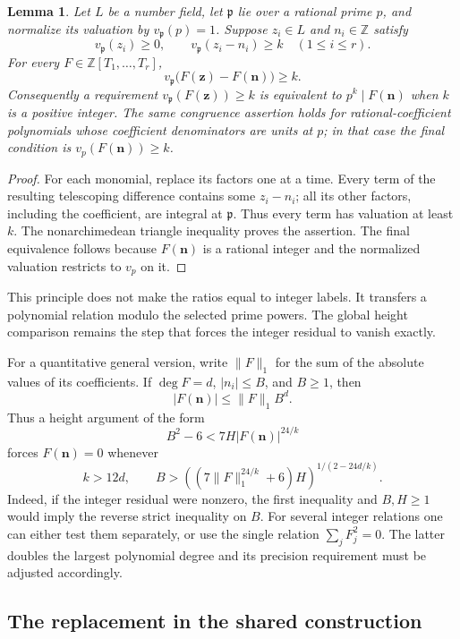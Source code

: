 \documentclass[11pt]{article}
\newtheorem{lemma}[theorem]{Lemma}
\theoremstyle{definition}
\begin{document}
\begin{lemma}\label{lem:direct-polynomial-congruence}
Let $L$ be a number field, let $\mathfrak p$ lie over a rational
prime $p$, and normalize its valuation by $v_{\mathfrak p}(p)=1$.
Suppose $z_i\in L$ and $n_i\in\mathbb Z$ satisfy
\[
 v_{\mathfrak p}(z_i)\ge0,
 \qquad v_{\mathfrak p}(z_i-n_i)\ge k
 \quad(1\le i\le r).
\]
For every $F\in\mathbb Z[T_1,\ldots,T_r]$,
\[
 v_{\mathfrak p}\bigl(F(\mathbf z)-F(\mathbf n)\bigr)\ge k.
\]
Consequently a requirement $v_{\mathfrak p}(F(\mathbf z))\ge k$
is equivalent to $p^k\mid F(\mathbf n)$ when $k$ is a positive
integer.  The same congruence assertion holds for rational-coefficient
polynomials whose coefficient denominators are units at $p$; in that
case the final condition is $v_p(F(\mathbf n))\ge k$.
\end{lemma}
\begin{proof}
For each monomial, replace its factors one at a time.  Every term
of the resulting telescoping difference contains some $z_i-n_i$;
all its other factors, including the coefficient, are integral at
$\mathfrak p$.  Thus every term has valuation at least $k$.
The nonarchimedean triangle inequality proves the assertion.
The final equivalence follows because $F(\mathbf n)$ is a rational
integer and the normalized valuation restricts to $v_p$ on it.
\end{proof}

This principle does not make the ratios equal to integer labels.
It transfers a polynomial relation modulo the selected prime powers.
The global height comparison remains the step that forces the
integer residual to vanish exactly.

For a quantitative general version, write
$\|F\|_1$ for the sum of the absolute values of its coefficients.
If $\deg F=d$, $|n_i|\le B$, and $B\ge1$, then
\[
                    |F(\mathbf n)|\le\|F\|_1B^d.
\]
Thus a height argument of the form
\[
 B^2-6<7H|F(\mathbf n)|^{24/k}
\]
forces $F(\mathbf n)=0$ whenever
\[
 k>12d,\qquad
 B>\left((7\|F\|_1^{24/k}+6)H\right)^{1/(2-24d/k)}.
\]
Indeed, if the integer residual were nonzero, the first inequality
and $B,H\ge1$ would imply the reverse strict inequality on $B$.
For several integer relations one can either test them separately,
or use the single relation $\sum_jF_j^2=0$.  The latter doubles
the largest polynomial degree and its precision requirement must
be adjusted accordingly.

\subsection{The replacement in the shared construction}
\end{document}
